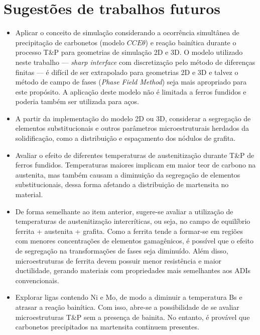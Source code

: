 \chapter{Sugestões de trabalhos futuros}

\begin{itemize}
	\item Aplicar o conceito de simulação considerando a ocorrência simultânea de precipitação de carbonetos (modelo $CCE\theta$) e reação bainítica durante o processo T\&P para geometrias de simulação 2D e 3D. O modelo utilizado neste trabalho --- \textit{sharp interface} com discretização pelo método de diferenças finitas --- é difícil de ser extrapolado para geometrias 2D e 3D e talvez o método de campo de fases (\textit{Phase Field Method}) seja mais apropriado para este propósito. A aplicação deste modelo não é limitada a ferros fundidos e poderia também ser utilizada para aços.

	\item A partir da implementação do modelo 2D ou 3D, considerar a segregação de elementos substitucionais e outros parâmetros microestruturais herdados da solidificação, como a distribuição e espaçamento dos nódulos de grafita.

	\item Avaliar o efeito de diferentes temperaturas de austenitização durante T\&P de ferros fundidos. Temperaturas maiores implicam em maior teor de carbono na austenita, mas também causam a diminuição da segregação de elementos substitucionais, dessa forma afetando a distribuição de martensita no material.

	\item De forma semelhante ao item anterior, sugere-se avaliar a utilização de temperaturas de austenitização intercríticas, ou seja, no campo de equilíbrio ferrita + austenita + grafita. Como a ferrita tende a formar-se em regiões com menores concentrações de elementos gamagênicos, é possível que o efeito de segregação na transformações de fases seja diminuído. Além disso, microestruturas de ferrita devem possuir menor resistência e maior ductilidade, gerando materiais com propriedades mais semelhantes aos ADIs convencionais.

	\item Explorar ligas contendo Ni e Mo, de modo a diminuir a temperatura Bs e atrasar a reação bainítica. Com isso, abre-se a possibilidade de se avaliar microestruturas T\&P sem a presença de bainita. No entanto, é provável que carbonetos precipitados na martensita continuem presentes.

\end{itemize}

